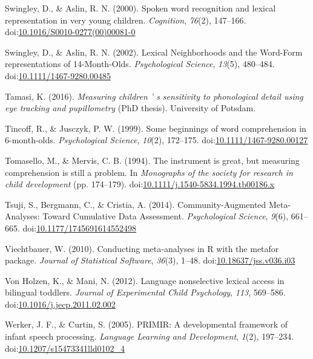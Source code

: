 \documentclass[man]{apa6}
\begin{document}
\leavevmode\hypertarget{ref-Swingley2000}{}%
Swingley, D., \& Aslin, R. N. (2000). Spoken word recognition and lexical representation in very young children. \emph{Cognition}, \emph{76}(2), 147--166. doi:\href{https://doi.org/10.1016/S0010-0277(00)00081-0}{10.1016/S0010-0277(00)00081-0}

\leavevmode\hypertarget{ref-Swingley2002}{}%
Swingley, D., \& Aslin, R. N. (2002). Lexical Neighborhoods and the Word-Form representations of 14-Month-Olds. \emph{Psychological Science}, \emph{13}(5), 480--484. doi:\href{https://doi.org/10.1111/1467-9280.00485}{10.1111/1467-9280.00485}

\leavevmode\hypertarget{ref-Tamasi2016}{}%
Tamasi, K. (2016). \emph{Measuring children ' s sensitivity to phonological detail using eye tracking and pupillometry} (PhD thesis). University of Potsdam.

\leavevmode\hypertarget{ref-Tincoff1999}{}%
Tincoff, R., \& Jusczyk, P. W. (1999). Some beginnings of word comprehension in 6-month-olds. \emph{Psychological Science}, \emph{10}(2), 172--175. doi:\href{https://doi.org/10.1111/1467-9280.00127}{10.1111/1467-9280.00127}

\leavevmode\hypertarget{ref-Tomasello1994}{}%
Tomasello, M., \& Mervis, C. B. (1994). The instrument is great, but measuring comprehension is still a problem. In \emph{Monographs of the society for research in child development} (pp. 174--179). doi:\href{https://doi.org/10.1111/j.1540-5834.1994.tb00186.x}{10.1111/j.1540-5834.1994.tb00186.x}

\leavevmode\hypertarget{ref-Tsuji2014}{}%
Tsuji, S., Bergmann, C., \& Cristia, A. (2014). Community-Augmented Meta-Analyses: Toward Cumulative Data Assessment. \emph{Psychological Science}, \emph{9}(6), 661--665. doi:\href{https://doi.org/10.1177/1745691614552498}{10.1177/1745691614552498}

\leavevmode\hypertarget{ref-metafor}{}%
Viechtbauer, W. (2010). Conducting meta-analyses in R with the metafor package. \emph{Journal of Statistical Software}, \emph{36}(3), 1--48. doi:\href{https://doi.org/10.18637/jss.v036.i03}{10.18637/jss.v036.i03}

\leavevmode\hypertarget{ref-VonHolzen2012}{}%
Von Holzen, K., \& Mani, N. (2012). Language nonselective lexical access in bilingual toddlers. \emph{Journal of Experimental Child Psychology}, \emph{113}, 569--586. doi:\href{https://doi.org/10.1016/j.jecp.2011.02.002}{10.1016/j.jecp.2011.02.002}

\leavevmode\hypertarget{ref-Werker2005}{}%
Werker, J. F., \& Curtin, S. (2005). PRIMIR: A developmental framework of infant speech processing. \emph{Language Learning and Development}, \emph{1}(2), 197--234. doi:\href{https://doi.org/10.1207/s15473341lld0102_4}{10.1207/s15473341lld0102\_4}
\end{document}
